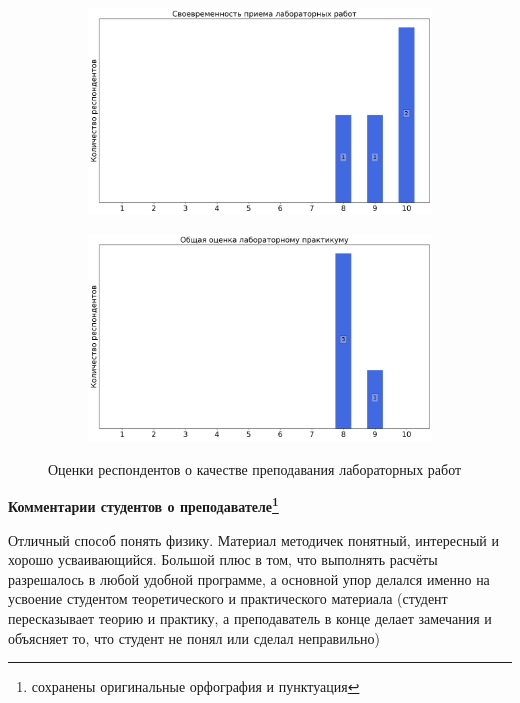 \begin{figure}[H]
\begin{subfigure}[b]{0.45\textwidth}
				\includegraphics[width=\textwidth]{images/1 course/Общая физика - механика/labniks-marks-Джанибекова С.Х.-2.png}
			\end{subfigure}
			\begin{subfigure}[b]{0.45\textwidth}
				\centering
				\includegraphics[width=\textwidth]{images/1 course/Общая физика - механика/labniks-marks-Джанибекова С.Х.-3.png}
			\end{subfigure}	
			\caption{Оценки респондентов о качестве преподавания лабораторных работ}
		\end{figure}

		\textbf{Комментарии студентов о преподавателе\protect\footnote{сохранены оригинальные орфография и пунктуация}}
            \begin{commentbox} 
                Отличный способ понять физику. Материал методичек понятный, интересный и хорошо усваивающийся. Большой плюс в том, что выполнять расчёты разрешалось в любой удобной программе, а основной упор делался именно на усвоение студентом теоретического и практического материала (студент пересказывает теорию и практику, а преподаватель в конце делает замечания и объясняет то, что студент не понял или сделал неправильно)
            \end{commentbox} 
       
